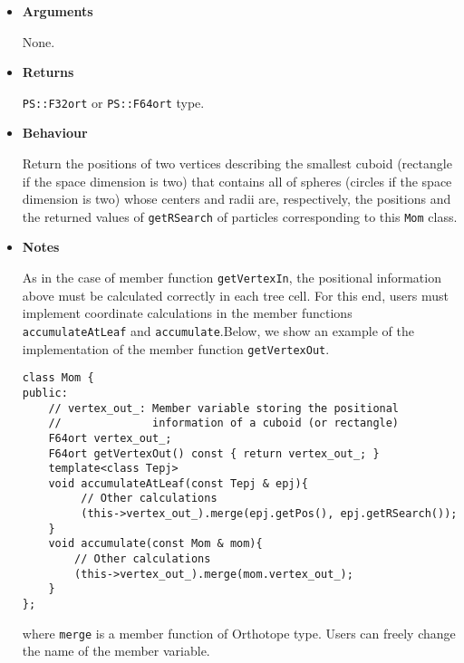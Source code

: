 \begin{itemize}

\item {\bf Arguments}

None.
  
\item {\bf Returns}

\texttt{PS::F32ort} or \texttt{PS::F64ort} type.

\item {\bf Behaviour}

Return the positions of two vertices describing the smallest cuboid (rectangle if the space dimension is two) that contains all of spheres (circles if the space dimension is two) whose centers and radii are, respectively, the positions and the returned values of \texttt{getRSearch} of particles corresponding to this \texttt{Mom} class. 

\item {\bf Notes}

As in the case of member function \texttt{getVertexIn}, the positional information above must be calculated correctly in each tree cell. For this end, users must implement coordinate calculations in the member functions \texttt{accumulateAtLeaf} and \texttt{accumulate}.Below, we show an example of the implementation of the member function \texttt{getVertexOut}.
  
\begin{screen}
\begin{verbatim}
class Mom {
public:
    // vertex_out_: Member variable storing the positional
    //              information of a cuboid (or rectangle)
    F64ort vertex_out_; 
    F64ort getVertexOut() const { return vertex_out_; }
    template<class Tepj>
    void accumulateAtLeaf(const Tepj & epj){ 
         // Other calculations
         (this->vertex_out_).merge(epj.getPos(), epj.getRSearch());
    }
    void accumulate(const Mom & mom){
        // Other calculations
        (this->vertex_out_).merge(mom.vertex_out_);
    }
};
\end{verbatim}
\end{screen}
where \texttt{merge} is a member function of Orthotope type.
Users can freely change the name of the member variable.
  
\end{itemize}